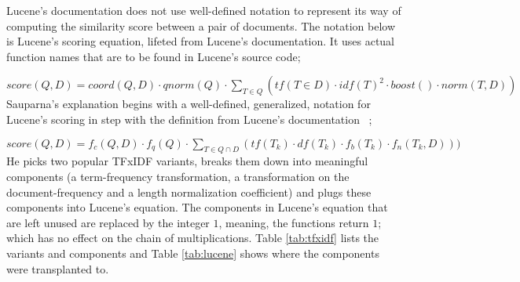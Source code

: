Lucene's documentation does not use well-defined notation to represent
its way of computing the similarity score between a pair of
documents. The notation below is Lucene's scoring equation, lifeted
from Lucene's documentation. It uses actual function names that are to
be found in Lucene's source code;

$score(Q,D) = coord(Q,D) \cdot qnorm(Q) \cdot \displaystyle\sum_{T \in Q} (tf(T \in D) \cdot idf(T)^2 \cdot boost() \cdot norm(T, D))$\\

Sauparna's explanation begins with a well-defined, generalized,
notation for Lucene's scoring in step with the definition from
Lucene's documentation ~\cite{Lucene:6.2.1:Scoring};

$score(Q,D) = f_{c}(Q,D) \cdot f_{q}(Q) \cdot \displaystyle\sum_{T \in Q \cap D}(tf(T_{k}) \cdot df(T_{k}) \cdot f_{b}(T_{k}) \cdot f_{n}(T_{k},D)))$\\

He picks two popular TFxIDF variants, breaks them down into meaningful
components (a term-frequency transformation, a transformation on the
document-frequency and a length normalization coefficient) and plugs
these components into Lucene's equation. The components in Lucene's
equation that are left unused are replaced by the integer $1$,
meaning, the functions return $1$; which has no effect on the chain of
multiplications. Table \ref{tab:tfxidf} lists the variants and
components and Table \ref{tab:lucene} shows where the components were
transplanted to.

